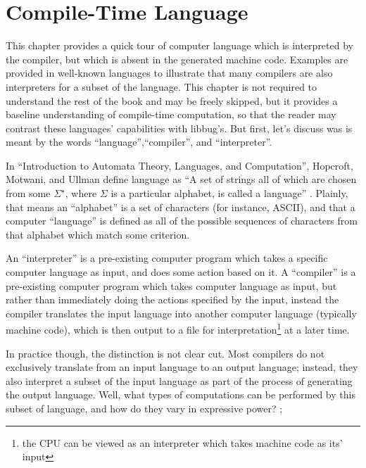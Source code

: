  \appendix
 \appendixpage
 \noappendicestocpagenum
 \chapter{Compile-Time Language}

 This chapter provides a quick tour of computer language which is interpreted
 by the compiler, but which is absent in the generated machine
 code.  Examples are provided in well-known languages to illustrate that
 many compilers are also interpreters for a subset of the language.  This
 chapter is not required to understand the rest of the book and may be freely
 skipped, but it provides a baseline understanding of compile-time computation,
 so that the reader may contrast these languages' capabilities with libbug's.
 But first, let's discuss was is meant by the words ``language'',``compiler'', and
 ``interpreter''.

 In ``Introduction to Automata Theory, Languages, and Computation'', Hopcroft,
 Motwani, and Ullman define language as ``A set of strings all of which are chosen
 from some $\Sigma^{\star}$, where $\Sigma$ is a particular alphabet, is called
 a language'' \cite[p. 30]{hmu2001}.
 Plainly, that means an ``alphabet'' is a set of characters (for instance, ASCII), and
 that a computer ``language'' is defined as all of the possible sequences of characters
 from that alphabet which match some criterion.

 An ``interpreter'' is a pre-existing computer program which takes a specific
 computer language as input,
 and does some action based on it.  A ``compiler'' is a pre-existing computer program
 which takes computer language as input,
 but rather than immediately doing the actions specified by the input, instead the compiler
 translates the input language
 into another computer language (typically machine code), which is then output to a file
 for interpretation\footnote{the CPU can be viewed as an
 interpreter which takes machine code as its' input} at a later time.

 In practice though, the distinction is not clear cut.  Most compilers do not exclusively
 translate from an input language
 to an output language; instead, they also interpret a subset of the input
 language as part of the process of generating the output language.  Well, what
 types of computations can be performed by this subset of language, and how do
 they vary in expressive power?
;
